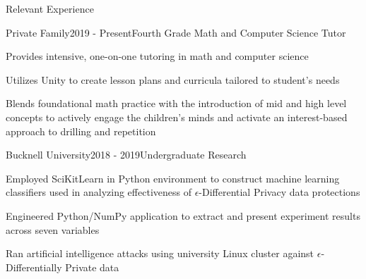 \documentclass{resume} %
\begin{document}
\begin{rSection}{Relevant Experience}

\iffalse
\begin{rWorkSubsection}{Nooch's Pub and Grill}{November 2019 - Present}{A Stinking Cook}{}
\item Who the fuck cares?
\end{rWorkSubsection}
\fi

\begin{rWorkSubsection}{Private Family}{2019 - Present}{Fourth Grade Math and Computer Science Tutor}{}
\item Provides intensive, one-on-one tutoring in math and computer science
\item Utilizes Unity to create lesson plans and curricula tailored to student's needs  
\item Blends foundational math practice with the introduction of mid and high level concepts to actively engage the children's minds and activate an interest-based approach to drilling and repetition
\end{rWorkSubsection}


\begin{rWorkSubsection}{Bucknell University}{2018 - 2019}{Undergraduate Research}{}
\item Employed SciKitLearn in Python environment to construct machine learning classifiers used in analyzing effectiveness of $\epsilon$-Differential Privacy data protections
\item Engineered Python/NumPy application to extract and present experiment results across seven variables
\item Ran artificial intelligence attacks using university Linux cluster against $\epsilon$-Differentially Private data
\end{rWorkSubsection}

\iffalse
\begin{rWorkSubsection}{Marissa Deihl, SP}{September 2018 - May 2019}{Software Developer}{}
\item Primarily responsible for identifying project goals and realizing those goals in code
\item Collaborated on team using agile and scrum methodologies to build Unity environment educational application
\item Managed feedback in data driven iterative design and testing process, iterating project three times in seven months
\end{rWorkSubsection}
\fi


\end{rSection}
\end{document}
